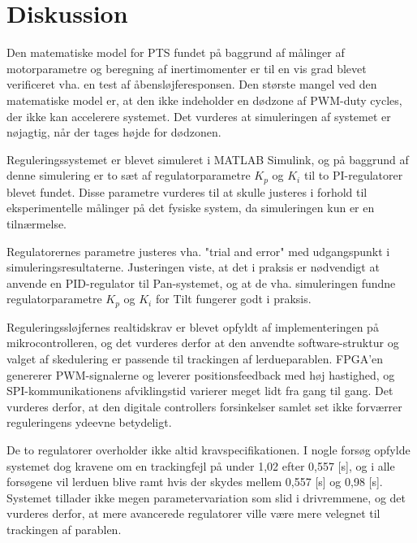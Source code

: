 \section{Diskussion}
\label{sec:diskussion}
Den matematiske model for PTS fundet på baggrund af
målinger af motorparametre og beregning af inertimomenter
er til en vis grad blevet verificeret vha. en test af åbensløjferesponsen.
Den største mangel ved den matematiske model er, at den ikke indeholder en dødzone
af PWM-duty cycles, der ikke kan accelerere systemet. Det vurderes
at simuleringen af systemet er nøjagtig, når der tages højde for dødzonen.

Reguleringssystemet er blevet simuleret i MATLAB Simulink, og på baggrund af denne simulering
er to sæt af regulatorparametre \(K_p\) og \(K_i\) til to PI-regulatorer blevet fundet.
Disse parametre vurderes til at skulle justeres
i forhold til eksperimentelle målinger på det fysiske system, da simuleringen kun er en tilnærmelse.

Regulatorernes parametre justeres vha. "trial and error"
med udgangspunkt i simuleringsresultaterne.
Justeringen viste, at det i praksis er nødvendigt at anvende en PID-regulator til Pan-systemet,
og at de vha. simuleringen fundne regulatorparametre \(K_p\) og \(K_i\) for Tilt fungerer godt i praksis.

Reguleringssløjfernes realtidskrav er blevet opfyldt af implementeringen på mikrocontrolleren,
og det vurderes derfor at den anvendte software-struktur og valget af skedulering
er passende til trackingen af lerdueparablen.
FPGA'en genererer PWM-signalerne og leverer positionsfeedback med høj hastighed,
og SPI-kommunikationens afviklingstid varierer meget lidt fra gang til gang.
Det vurderes derfor, at den digitale controllers forsinkelser samlet set ikke forværrer
reguleringens ydeevne betydeligt.

De to regulatorer overholder ikke altid kravspecifikationen.
I nogle forsøg opfylde systemet dog kravene om en trackingfejl på under 1,02\degree{}
efter 0,557 [s], og i alle forsøgene vil lerduen blive ramt hvis der skydes mellem 0,557 [s] og 0,98 [s].
Systemet tillader ikke megen parametervariation
som slid i drivremmene,
og det vurderes derfor, at mere avancerede regulatorer ville være mere velegnet til trackingen
af parablen.